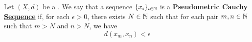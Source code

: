 \label{def:pseudometriccauchysequence}
\newcommand{\PseudometricCauchySequence}[0]{\textbf{\hyperref[def:pseudometriccauchysequence]{Pseudometric Cauchy Sequence}}\xspace}
\begin{df}

    Let $(X,d)$ be a \PseudometricSpace.
    We say that a sequence 
	$\{x_i\}_{i \in \mathbb{N}}$ is a 
	\PseudometricCauchySequence
    if, for each 
	$\epsilon > 0$, 
	there exists
	$N \in \mathbb{N}$
	such that for 
    each pair 
	$m,n \in \mathbb{N}$ 
	such that 
	$m>N$ 
	and 
	$n>N$, we have 
    \begin{equation}
        d(x_m,x_n) < \epsilon
    \end{equation}
\end{df}

